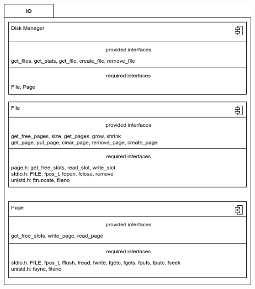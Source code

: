         \begin{center}
         \includegraphics[keepaspectratio, width=\textwidth, height=0.6\textheight]{img/io_arch.png} \\
        \end{center}
        \newpage

